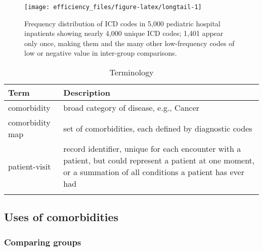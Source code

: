 \documentclass[article]{jss}
\begin{document}
\begin{CodeChunk}
\begin{figure}

{\centering \texttt{[image: efficiency\_files/figure-latex/longtail-1]} 

}

\caption[Frequency distribution of ICD codes in 5,000 pediatric hospital inpatients showing nearly 4,000 unique ICD codes]{Frequency distribution of ICD codes in 5,000 pediatric hospital inpatients showing nearly 4,000 unique ICD codes; 1,401 appear only once, making them and the many other low-frequency codes of low or negative value in inter-group comparisons.}\label{fig:longtail}
\end{figure}
\end{CodeChunk}

\begin{longtable}{l|p{10 cm}}
\hline
Term & Description\\
\hline
comorbidity & broad category of disease, e.g., Cancer\\
\hline
comorbidity map & set of comorbidities, each defined by diagnostic codes\\
\hline
patient-visit & record identifier, unique for each encounter with a patient, but could represent a patient at one moment, or a summation of all conditions a patient has ever had\\
\hline
\caption{\label{tab:terminology}Terminology}\\
\end{longtable}

\newpage

\hypertarget{uses-of-comorbidities}{%
\subsection{Uses of comorbidities}\label{uses-of-comorbidities}}

\hypertarget{comparing-groups}{%
\subsubsection{Comparing groups}\label{comparing-groups}}
\end{document}
